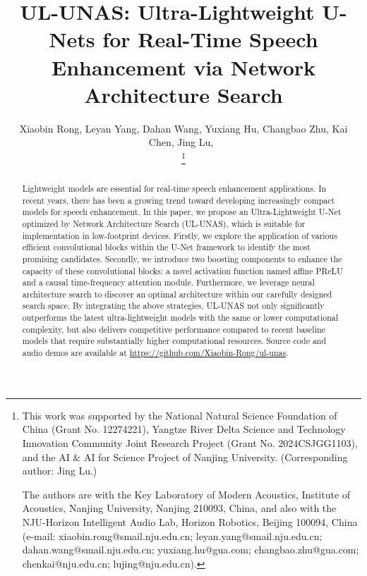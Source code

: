 \documentclass[journal]{IEEEtran}
\newcommand{\rrev}[1]{#1}
\begin{document}
\title{UL-UNAS: Ultra-Lightweight U-Nets for Real-Time Speech Enhancement via Network Architecture Search}
\author{Xiaobin Rong, Leyan Yang, Dahan Wang, Yuxiang Hu, Changbao Zhu, Kai Chen, Jing Lu,~

\thanks{This work was supported by the National Natural Science Foundation of China (Grant No. 12274221), Yangtze River Delta Science and Technology Innovation Community Joint Research Project (Grant No. 2024CSJGG1103), and the AI \& AI for Science Project of Nanjing University. (Corresponding author: Jing Lu.)

The authors are with the Key Laboratory of Modern Acoustics, Institute of Acoustics, Nanjing University, Nanjing 210093, China, and also with the NJU-Horizon Intelligent Audio Lab, Horizon Robotics, Beijing 100094, China (e-mail: xiaobin.rong@smail.nju.edu.cn; leyan.yang@smail.nju.edu.cn; dahan.wang@smail.nju.edu.cn; yuxiang.hu@gua.com; changbao.zhu@gua.com; chenkai@nju.edu.cn; lujing@nju.edu.cn).}}

\maketitle

\begin{abstract}
Lightweight models are essential for real-time speech enhancement applications. In recent years, there has been a growing trend toward developing increasingly compact models for speech enhancement. In this paper, we propose an Ultra-Lightweight U-Net optimized by Network Architecture Search (UL-UNAS), which is suitable for implementation in low-footprint devices. Firstly, we explore the application of various efficient convolutional blocks within the U-Net framework to identify the most promising candidates. Secondly, we introduce two boosting components to enhance the capacity of these convolutional blocks: a novel activation function named affine PReLU and a causal time-frequency attention module. Furthermore, we leverage neural architecture search to discover an optimal architecture within our carefully designed search space. By integrating the above strategies, UL-UNAS not only significantly outperforms the latest ultra-lightweight models with the same or lower computational complexity, but also delivers competitive performance compared to recent baseline models that require substantially higher computational resources. \rrev{Source code and audio demos are available at \url{https://github.com/Xiaobin-Rong/ul-unas}.}
\end{abstract}
\end{document}
